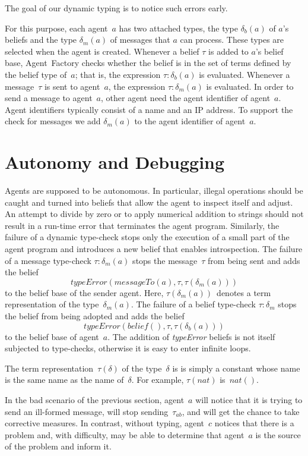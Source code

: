 \documentclass[preprint]{sigplanconf} %
\theoremstyle{remark}
\begin{document}
The goal of our dynamic typing is to notice such errors early.

For this purpose, each agent~$a$ has two attached types, the type
$\delta_b(a)$ of $a$'s beliefs and the type $\delta_m(a)$ of messages that
$a$ can process. These types are selected when the agent is created.
Whenever a belief $\tau$ is added to $a$'s belief base, Agent~Factory
checks whether the belief is in the set of terms defined by the belief type
of~$a$; that is, the expression $\tau:\delta_b(a)$ is evaluated. Whenever a
message~$\tau$ is sent to agent~$a$, the expression $\tau:\delta_m(a)$ is
evaluated. In order to send a message to agent~$a$, other agent need the
agent identifier of agent~$a$. Agent identifiers typically consist of a
name and an IP address. To support the check for messages we add
$\delta_m(a)$ to the agent identifier of agent~$a$.

\section{Autonomy and Debugging} \label{sec:bugs} %

Agents are supposed to be autonomous. In particular, illegal operations
should be caught and turned into beliefs that allow the agent to inspect
itself and adjust. An attempt to divide by zero or to apply numerical
addition to strings should not result in a run-time error that terminates
the agent program. Similarly, the failure of a dynamic type-check stops
only the execution of a small part of the agent program and introduces a
new belief that enables introspection. The failure of a message type-check
$\tau:\delta_m(a)$ stops the message~$\tau$ from being sent and adds the
belief \[\mathit{typeError}(\mathit{messageTo}(a), \tau, \tau(\delta_m(a)))
\] to the belief base of the sender agent. Here,
$\tau(\delta_m(a))$~denotes a term representation of the
type~$\delta_m(a)$.  The failure of a belief type-check $\tau:\delta_m$
stops the belief from being adopted and adds the belief
\[\mathit{typeError}(\mathit{belief}(), \tau, \tau(\delta_b(a))) \] to the
belief base of agent~$a$. The addition of \textit{typeError} beliefs is not
itself subjected to type-checks, otherwise it is easy to enter infinite
loops.

The term representation~$\tau(\delta)$ of the type~$\delta$ is is simply a
constant whose name is the same name as the name of~$\delta$. For example,
$\tau(\mathit{nat})$ is~$\mathit{nat}()$.

In the bad scenario of the previous section, agent~$a$ will notice that it
is trying to send an ill-formed message, will stop sending~$\tau_{ab}$, and
will get the chance to take corrective measures. In contrast, without
typing, agent~$c$ notices that there is a problem and, with difficulty, may
be able to determine that agent~$a$ is the source of the problem and inform
it.
\end{document}
